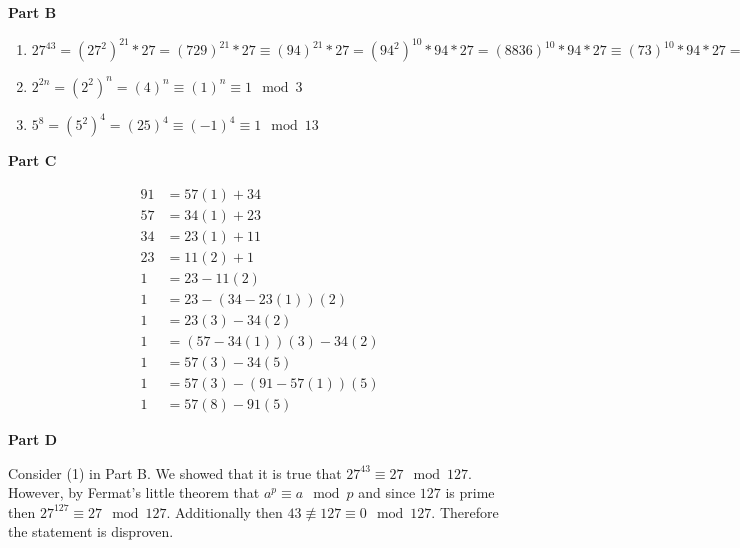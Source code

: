 \documentclass{article}
\begin{document}
\textbf{Part B}

\begin{enumerate}
    \item 
    
    $27^{43} = (27^2)^{21}*27 = (729)^{21}*27 \equiv (94)^{21}*27 = (94^2)^{10}*94*27 = (8836)^{10}*94*27\equiv (73)^{10}*94*27 = (73^2)^5*94*27 = (5329)^5*94*27\equiv (122)^5*94*27 = (122^2)^2*122*94*27 = (14884)^2*122*94*27\equiv (25)^2*122*94*27 = (625)*122*94*27 \equiv 177*122*94*27 = 14274*94*27 \equiv 50*94*27 = 4700*27 \equiv 1*27 \equiv 27 \mod 127$
    
    \item
    
    $2^{2n} = (2^2)^n = (4)^n \equiv (1)^n \equiv 1 \mod 3$
    
    \item
    
    $5^8 = (5^2)^4 = (25)^4 \equiv (-1)^4 \equiv 1 \mod 13$
    
\end{enumerate}

\textbf{Part C}

\begin{align*}
    91 &= 57(1) + 34\\
    57 &= 34(1) + 23\\
    34 &= 23(1) + 11\\
    23 &= 11(2) + 1\\
    1 &= 23 - 11(2)\\
    1 &= 23 - (34-23(1))(2)\\
    1 &= 23(3) - 34(2)\\
    1 &= (57 - 34(1))(3) - 34(2)\\
    1 &= 57(3) - 34(5)\\
    1 &= 57(3) - (91 - 57(1))(5)\\
    1 &= 57(8) - 91(5)
\end{align*}

\textbf{Part D}

Consider (1) in Part B. We showed that it is true that $27^{43} \equiv 27 \mod 127.$ However, by Fermat's little theorem that $a^p\equiv a \mod p$ and since $127$ is prime then $27^{127} \equiv 27 \mod 127$. Additionally then $43\not\equiv 127 \equiv 0 \mod 127$. Therefore the statement is disproven.

\clearpage
\end{document}
